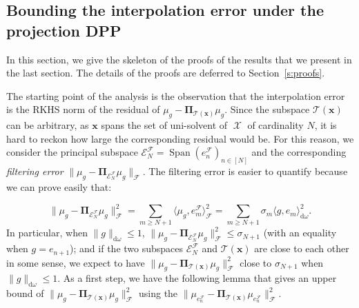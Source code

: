 \documentclass[twoside,11pt]{book}
\newtheorem{proposition}{Proposition}
\numberwithin{theorem}{chapter}
\numberwithin{definition}{chapter}
\numberwithin{proposition}{chapter}
\numberwithin{corollary}{chapter}
\numberwithin{example}{chapter}
\numberwithin{lemma}{chapter}
\DeclareMathOperator{\Span}{\mathrm{Span}}
\DeclareMathOperator{\F}{\mathcal{F}}
\DeclareMathOperator{\X}{\mathcal{X}}
\newcommand{\pc}[1]{\textcolor{blue}{#1}}
\begin{document}


\subsection{Bounding the interpolation error under the projection DPP}
\label{subsec:dpp_quadrature_error_weak}
In this section, we give the skeleton of the proofs of the results that we present in the last section. The details of the proofs are deferred to Section~\ref{s:proofs}.

The starting point of the analysis is the observation that the interpolation error is the RKHS norm of the residual of $\mu_{g} - \bm{\Pi}_{\mathcal{T}(\bm{x})} \mu_{g}$. Since the subspace $\mathcal{T}(\bm{x})$ can be arbitrary, as $\bm{x}$ spans the set of uni-solvent of $\X$ of cardinality $N$, it is hard to reckon how large the corresponding residual would be. For this reason, we consider the principal subspace $\mathcal{E}_N^{\mathcal{F}} = \Span(e_{n}^{\mathcal{F}})_{n \in [N]}$ and the corresponding \emph{filtering error} $\|\mu_{g} - \bm{\Pi}_{\mathcal{E}_{N}^{\mathcal{F}}} \mu_{g}\|_{\mathcal{F}}$. The filtering error is easier to quantify because we can prove easily that:

\begin{equation}
\|\mu_{g} - \bm{\Pi}_{\mathcal{E}_{N}^{\mathcal{F}}} \mu_{g}\|_{\mathcal{F}}^{2} = \sum\limits_{m \geq N+1} \langle \mu_{g},e_{m}^{\mathcal{F}} \rangle_{\mathcal{F}}^{2} = \sum\limits_{m \geq N+1} \sigma_{m} \langle g,e_{m} \rangle_{\mathrm{d}\omega}^{2}.
\end{equation}
In particular, when $\|g\|_{\mathrm{d}\omega} \leq 1$, $\|\mu_{g} - \bm{\Pi}_{\mathcal{E}_{N}^{\mathcal{F}}} \mu_{g}\|_{\mathcal{F}}^{2} \leq \sigma_{N+1}$ (with an equality when $g = e_{n+1}$); and if the two subspaces $\mathcal{E}_{N}^{\mathcal{F}}$ and $\mathcal{T}(\bm{x})$ are close to each other in some sense, we expect to have $\|\mu_{g} - \bm{\Pi}_{\mathcal{T}(\bm{x})} \mu_{g}\|_{\mathcal{F}}^{2}$ close to  $\sigma_{N+1}$ when $\|g\|_{\mathrm{d}\omega} \leq 1$. As a first step, we have the following lemma that gives an upper bound of $\|\mu_{g} - \bm{\Pi}_{\mathcal{T}(\bm{x})}\mu_{g}\|^{2}_{\mathcal{F}}$ using the $\|\mu_{e_{n}^{\F}} - \bm{\Pi}_{\mathcal{T}(\bm{x})} \mu_{e_{n}^{\F}}\|_{\mathcal{F}}^{2}$.
\end{document}
